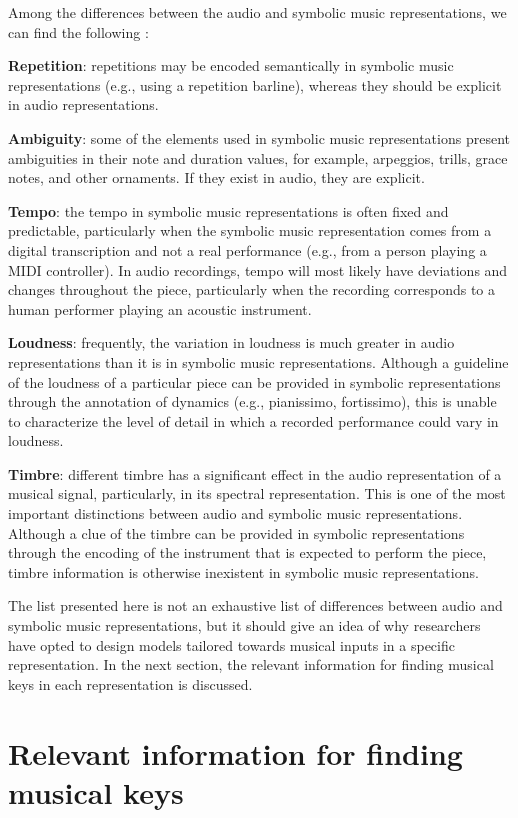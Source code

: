 Among the differences between the audio and symbolic music representations, we can find the following \cite{fremerey_towards_2009}:

\textbf{Repetition}: repetitions may be encoded semantically in symbolic music representations (e.g., using a repetition barline), whereas they should be explicit in audio representations.

\textbf{Ambiguity}: some of the elements used in symbolic music representations present ambiguities in their note and duration values, for example, arpeggios, trills, grace notes, and other ornaments. If they exist in audio, they are explicit.

\textbf{Tempo}: the tempo in symbolic music representations is often fixed and predictable, particularly when the symbolic music representation comes from a digital transcription and not a real performance (e.g., from a person playing a MIDI controller). In audio recordings, tempo will most likely have deviations and changes throughout the piece, particularly when the recording corresponds to a human performer playing an acoustic instrument.

\textbf{Loudness}: frequently, the variation in loudness is much greater in audio representations than it is in symbolic music representations. Although a guideline of the loudness of a particular piece can be provided in symbolic representations through the annotation of dynamics (e.g., pianissimo, fortissimo), this is unable to characterize the level of detail in which a recorded performance could vary in loudness.

\textbf{Timbre}: different timbre has a significant effect in the audio representation of a musical signal, particularly, in its spectral representation. This is one of the most important distinctions between audio and symbolic music representations. Although a clue of the timbre can be provided in symbolic representations through the encoding of the instrument that is expected to perform the piece, timbre information is otherwise inexistent in symbolic music representations.

The list presented here is not an exhaustive list of differences between audio and symbolic music representations, but it should give an idea of why researchers have opted to design models tailored towards musical inputs in a specific representation. In the next section, the relevant information for finding musical keys in each representation is discussed.

\section{Relevant information for finding musical keys}

